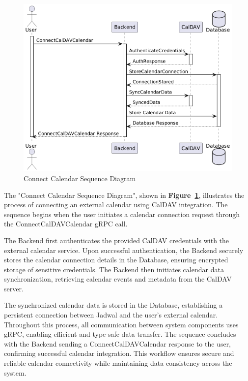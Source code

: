 \begin{figure}[!h]
  \centering
  \includegraphics[width=\textwidth]{images/docs/diagrams/sequence-diagrams/all-sequence-diagrams/Connect Calendar.png}
  \caption{Connect Calendar Sequence Diagram}
  \label{fig:seq/connect-calendar}
\end{figure}

The "Connect Calendar Sequence Diagram", shown in \textbf{Figure~\ref{fig:seq/connect-calendar}}, illustrates the process of connecting an external calendar using CalDAV integration. The sequence begins when the user initiates a calendar connection request through the ConnectCalDAVCalendar gRPC call.

The Backend first authenticates the provided CalDAV credentials with the external calendar service. Upon successful authentication, the Backend securely stores the calendar connection details in the Database, ensuring encrypted storage of sensitive credentials. The Backend then initiates calendar data synchronization, retrieving calendar events and metadata from the CalDAV server.

The synchronized calendar data is stored in the Database, establishing a persistent connection between Jadwal and the user's external calendar. Throughout this process, all communication between system components uses gRPC, enabling efficient and type-safe data transfer. The sequence concludes with the Backend sending a ConnectCalDAVCalendar response to the user, confirming successful calendar integration. This workflow ensures secure and reliable calendar connectivity while maintaining data consistency across the system.